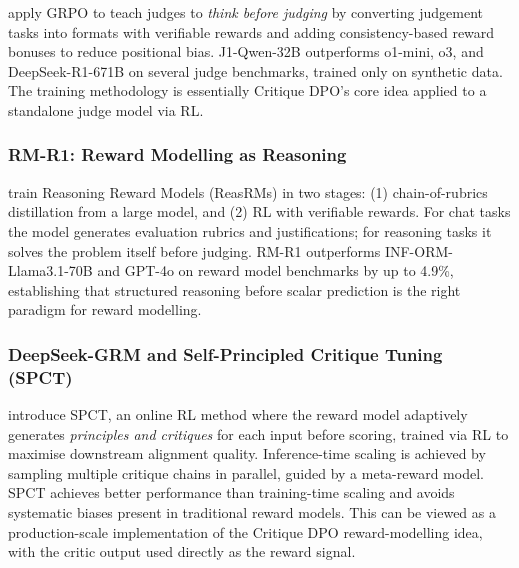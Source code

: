 \autocite{whitehouse2025j1incentivizingthinkingllmasajudge}
apply GRPO to teach judges to \emph{think before judging} by
converting judgement tasks into formats with verifiable rewards and
adding consistency-based reward bonuses to reduce positional bias.
J1-Qwen-32B outperforms o1-mini, o3, and DeepSeek-R1-671B on several
judge benchmarks, trained only on synthetic data.  The training
methodology is essentially Critique DPO's core idea applied to a
standalone judge model via RL.

\subsubsection{RM-R1: Reward Modelling as Reasoning}

\autocite{chen2025rmr1rewardmodelingreasoning}
train Reasoning Reward Models (ReasRMs) in two stages: (1)
chain-of-rubrics distillation from a large model, and (2) RL with
verifiable rewards.  For chat tasks the model generates evaluation
rubrics and justifications; for reasoning tasks it solves the problem
itself before judging.  RM-R1 outperforms INF-ORM-Llama3.1-70B and
GPT-4o on reward model benchmarks by up to 4.9\%, establishing that
structured reasoning before scalar prediction is the right paradigm
for reward modelling.

\subsubsection{DeepSeek-GRM and Self-Principled Critique Tuning (SPCT)}

\autocite{liu2025deepseekgrm} introduce SPCT, an online RL method
where the reward model adaptively generates \emph{principles and
  critiques} for each input before scoring, trained via RL to maximise
downstream alignment quality.  Inference-time scaling is achieved by
sampling multiple critique chains in parallel, guided by a
meta-reward model.  SPCT achieves better performance than
training-time scaling and avoids systematic biases present in
traditional reward models.  This can be viewed as a production-scale
implementation of the Critique DPO reward-modelling idea, with the
critic output used directly as the reward signal.



